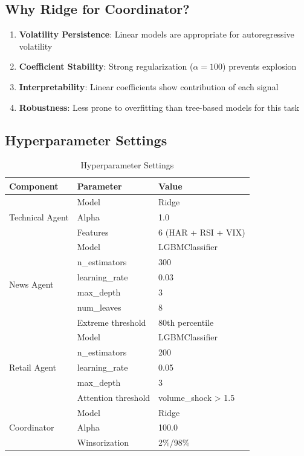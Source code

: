\documentclass[12pt,a4paper]{article}
\begin{document}
\subsection{Why Ridge for Coordinator?}

\begin{enumerate}
    \item \textbf{Volatility Persistence}: Linear models are appropriate for autoregressive volatility
    \item \textbf{Coefficient Stability}: Strong regularization ($\alpha=100$) prevents explosion
    \item \textbf{Interpretability}: Linear coefficients show contribution of each signal
    \item \textbf{Robustness}: Less prone to overfitting than tree-based models for this task
\end{enumerate}

\subsection{Hyperparameter Settings}

\begin{table}[H]
\centering
\begin{tabular}{lll}
\toprule
\textbf{Component} & \textbf{Parameter} & \textbf{Value} \\
\midrule
\multirow{3}{*}{Technical Agent} & Model & Ridge \\
& Alpha & 1.0 \\
& Features & 6 (HAR + RSI + VIX) \\
\midrule
\multirow{6}{*}{News Agent} & Model & LGBMClassifier \\
& n\_estimators & 300 \\
& learning\_rate & 0.03 \\
& max\_depth & 3 \\
& num\_leaves & 8 \\
& Extreme threshold & 80th percentile \\
\midrule
\multirow{5}{*}{Retail Agent} & Model & LGBMClassifier \\
& n\_estimators & 200 \\
& learning\_rate & 0.05 \\
& max\_depth & 3 \\
& Attention threshold & volume\_shock > 1.5 \\
\midrule
\multirow{3}{*}{Coordinator} & Model & Ridge \\
& Alpha & 100.0 \\
& Winsorization & 2\%/98\% \\
\bottomrule
\end{tabular}
\caption{Hyperparameter Settings}
\label{tab:hyperparams}
\end{table}
\end{document}
